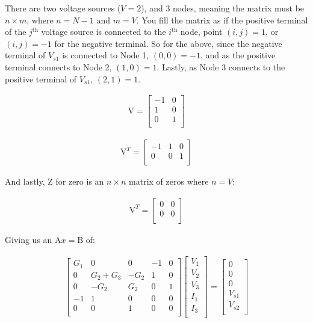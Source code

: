 There are two voltage sources ($V = 2$), and 3 nodes, meaning the matrix must be $n \times m$, where $n = N-1$ and $m = V$. You fill the matrix as if the positive terminal of the $j^{\mathrm{th}}$ voltage source is connected to the $i^{\mathrm{th}}$ node, point $(i,j) = 1$, or $(i,j) = -1$ for the negative terminal. So for the above, since the negative terminal of $V_{s1}$ is connected to Node 1, $(0,0) = -1$, and as the positive terminal connects to Node 2, $(1,0) = 1$. Lastly, as Node 3 connects to the positive terminal of $V_{s1}$, $(2,1) = 1$. 
\begin{multicols}{2}
\begin{align}
\mathrm{V} = 
\begin{bmatrix} 
-1 & 0 \\
1 & 0  \\
0 & 1  \\
\end{bmatrix}
\end{align}

\begin{align}
\mathrm{V}^T = 
\begin{bmatrix} 
-1 & 1 & 0 \\
0 & 0  & 1 \\
\end{bmatrix}
\end{align}
\end{multicols}

And lastly, Z for zero is an $n \times n$ matrix of zeros where $n = V$:

\begin{align}
\mathrm{V}^T = 
\begin{bmatrix} 
0 & 0  \\
0 & 0   \\
\end{bmatrix}
\end{align}

Giving us an $\mathrm{A}x = \mathrm{B}$ of: 

\begin{align}
\begin{bmatrix} 
G_1 & 0 & 0 & -1 & 0 \\
0 & G_2 + G_3 & -G_2 & 1 & 0  \\
0 & -G_2 & G_2 & 0 & 1  \\
-1 & 1 & 0 & 0 & 0  \\
0 & 0  & 1 & 0 & 0  \\
\end{bmatrix}
\begin{bmatrix} 
V_1 \\
V_2  \\
V_3  \\
I_1  \\
I_3 \\
\end{bmatrix}
=
\begin{bmatrix} 
0 \\
0  \\
0  \\
V_{s1}  \\
V_{s2} \\
\end{bmatrix}
\end{align}

